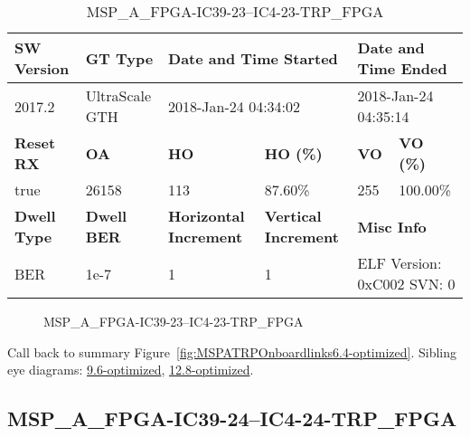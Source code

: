 \begin{table}[h]
\centering
\caption{MSP\_A\_FPGA-IC39-23--IC4-23-TRP\_FPGA}
\label{tab:MSPAFPGAIC3923IC423TRPFPGA6.4-optimized}
\begin{tabular}{@{}|l|l|l|l|l|l|@{}}
\toprule
\textbf{SW Version}                & \textbf{GT Type}   & \multicolumn{2}{l|}{\textbf{Date and Time Started}}            & \multicolumn{2}{l|}{\textbf{Date and Time Ended}}        \\ \midrule
2017.2                       & UltraScale GTH          & \multicolumn{2}{l|}{2018-Jan-24 04:34:02}                   & \multicolumn{2}{l|}{2018-Jan-24 04:35:14}               \\ \midrule
\textbf{Reset RX}                  & \textbf{OA} & \textbf{HO}   & \textbf{HO (\%)} & \textbf{VO} & \textbf{VO (\%)} \\ \midrule
true & 26158        & 113          & 87.60\%        & 255        & 100.00\%       \\ \midrule
\textbf{Dwell Type}                & \textbf{Dwell BER} & \textbf{Horizontal Increment} & \textbf{Vertical Increment}    & \multicolumn{2}{l|}{\textbf{Misc Info}}                  \\ \midrule
BER                            & 1e-7        & 1        & 1           & \multicolumn{2}{l|}{ELF Version: 0xC002 SVN: 0}                         \\ \bottomrule
\end{tabular}
\end{table}

\begin{figure}[h]
\caption{MSP\_A\_FPGA-IC39-23--IC4-23-TRP\_FPGA} \label{fig:MSPAFPGAIC3923IC423TRPFPGA6.4-optimized}
\end{figure}

Call back to summary Figure~\ref{fig:MSPATRPOnboardlinks6.4-optimized}.
Sibling eye diagrams: \hyperref[sec:MSPAFPGAIC3923IC423TRPFPGA9.6-optimized]{9.6-optimized}, \hyperref[sec:MSPAFPGAIC3923IC423TRPFPGA12.8-optimized]{12.8-optimized}.

\clearpage
\newpage


\subsection{MSP\_A\_FPGA-IC39-24--IC4-24-TRP\_FPGA}\label{sec:MSPAFPGAIC3924IC424TRPFPGA6.4-optimized}

